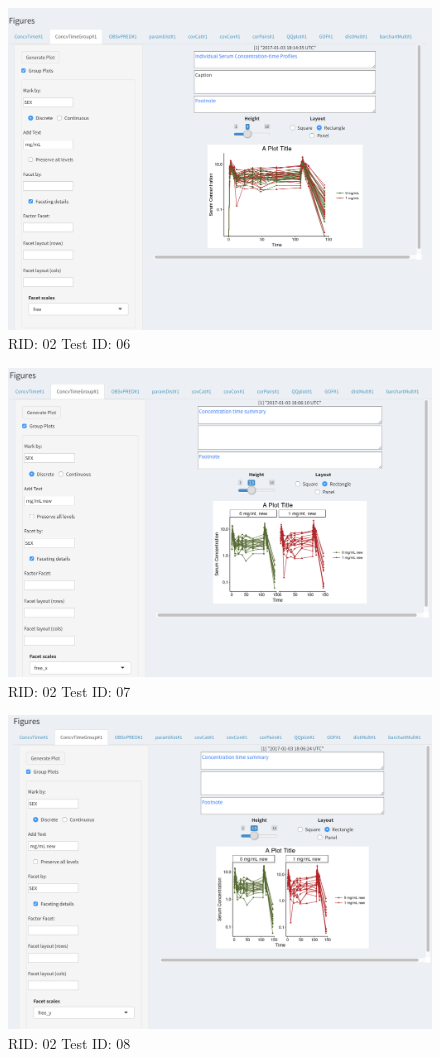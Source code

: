 \begin{figure}[H]
\includegraphics[width=.8\textwidth]{screencaps/02-06-1.png}
\caption{RID: 02 Test ID: 06}
\end{figure}
\begin{figure}[H]
\includegraphics[width=.8\textwidth]{screencaps/02-07-1.png}
\caption{RID: 02 Test ID: 07}
\end{figure}
\begin{figure}[H]
\includegraphics[width=.8\textwidth]{screencaps/02-08-1.png}
\caption{RID: 02 Test ID: 08}
\end{figure}
